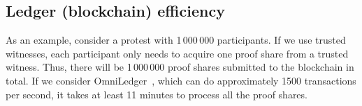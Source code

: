

\subsection{Ledger (blockchain) efficiency}
As an example, consider a protest with 1\,000\,000 participants.
If we use trusted witnesses, each participant only needs to acquire one proof share from a trusted witness.
Thus, there will be 1\,000\,000 proof shares submitted to the blockchain in total.
If we consider OmniLedger~\cite{OmniLedger}, which can do approximately 1500 transactions per second, it takes at least 11 minutes to process all the proof shares.

